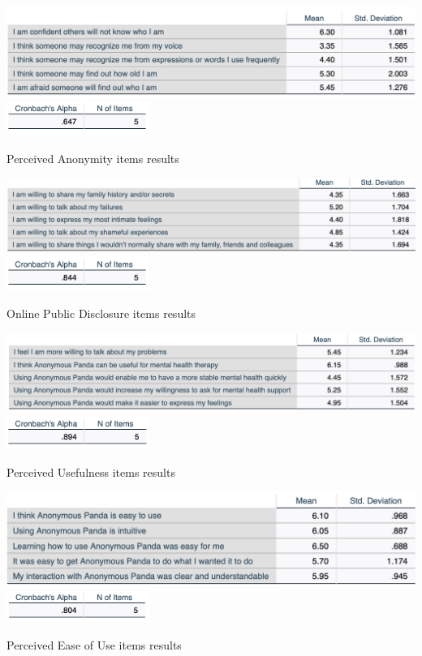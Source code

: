 \begin{table}[!htb]
\includegraphics[width=\textwidth]{figures/PA.png}
\includegraphics[width=0.35\textwidth]{figures/PAlpha.png}
\centering
\caption{Perceived Anonymity items results}
\label{tab:PA}
\end{table}

\begin{table}[!htb]
\includegraphics[width=\textwidth]{figures/OPD.png}
\includegraphics[width=0.35\textwidth]{figures/OPDalpha.png}
\centering
\caption{Online Public Disclosure items results}
\label{tab:OPD}
\end{table}

\begin{table}[!htb]
\includegraphics[width=\textwidth]{figures/PU.png}
\includegraphics[width=0.35\textwidth]{figures/PUalpha.png}
\centering
\caption{Perceived Usefulness items results}
\label{tab:PU}
\end{table}

\begin{table}[!htb]
\includegraphics[width=\textwidth]{figures/PEU.png}
\includegraphics[width=0.35\textwidth]{figures/PEUalpha.png}
\centering
\caption{Perceived Ease of Use items results}
\label{tab:PEU}
\end{table}


